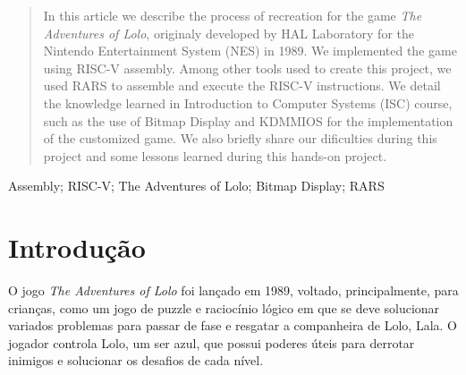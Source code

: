 \documentclass[10pt, conference, compsocconf]{IEEEtran}
\begin{document}
\begin{abstract}
  In this article we describe the process of recreation for the game \textit{The
    Adventures of Lolo}, originaly developed by HAL Laboratory for the Nintendo
  Entertainment System (NES) in 1989. We implemented the game using RISC-V
  assembly. Among other tools used to create this project, we used RARS to
  assemble and execute the RISC-V instructions. We detail the knowledge learned
  in Introduction to Computer Systems (ISC) course, such as the use of Bitmap
  Display and KDMMIOS for the implementation of the customized game. We also
  briefly share our dificulties during this project and some lessons learned
  during this hands-on project.


\end{abstract}

\begin{IEEEkeywords}
Assembly; RISC-V; The Adventures of Lolo; Bitmap Display; RARS
\end{IEEEkeywords}


\section{Introdução}

O jogo \textit{The Adventures of Lolo} foi lançado em 1989, voltado,
principalmente, para crianças, como um jogo de puzzle e raciocínio lógico em que
se deve solucionar variados problemas para passar de fase e resgatar a
companheira de Lolo, Lala. O jogador controla Lolo, um ser azul, que possui
poderes úteis para derrotar inimigos e solucionar os desafios de cada nível.
\end{document}
